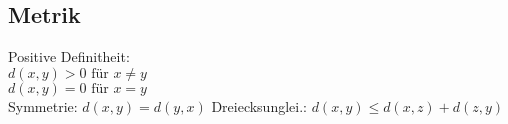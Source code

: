 \subsection*{Metrik}
    Positive Definitheit:\\
        $d(x, y) > 0 \text{ für } x \neq y$\\
        $d(x, y) = 0 \text{ für } x = y$\\
    Symmetrie: $d(x, y) = d(y, x)$
    Dreiecksunglei.: $d(x, y) \leq d(x, z) + d(z, y)$

